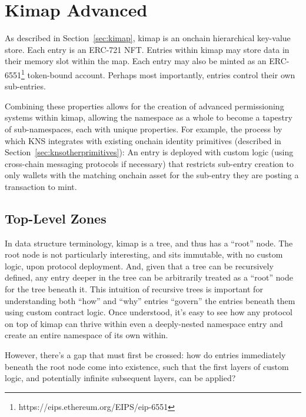 \documentclass[runningheads]{llncs}
\begin{document}
\section{Kimap Advanced}
\label{sec:kimapadvanced}

As described in Section~\ref{sec:kimap}, kimap is an onchain hierarchical key-value store.
Each entry is an ERC-721 NFT.
Entries within kimap may store data in their memory slot within the map.
Each entry may also be minted as an ERC-6551\footnote{https://eips.ethereum.org/EIPS/eip-6551} token-bound account.
Perhaps most importantly, entries control their own sub-entries.

Combining these properties allows for the creation of advanced permissioning systems within kimap, allowing the namespace as a whole to become a tapestry of sub-namespaces, each with unique properties.
For example, the process by which KNS integrates with existing onchain identity primitives (described in Section~\ref{sec:knsotherprimitives}):
An entry is deployed with custom logic (using cross-chain messaging protocols if necessary) that restricts sub-entry creation to only wallets with the matching onchain asset for the sub-entry they are posting a transaction to mint.

\subsection{Top-Level Zones}
\label{sec:tlz}

In data structure terminology, kimap is a tree, and thus has a ``root'' node.
The root node is not particularly interesting, and sits immutable, with no custom logic, upon protocol deployment.
And, given that a tree can be recursively defined, any entry deeper in the tree can be arbitrarily treated as a ``root'' node for the tree beneath it.
This intuition of recursive trees is important for understanding both ``how'' and ``why'' entries ``govern'' the entries beneath them using custom contract logic.
Once understood, it's easy to see how any protocol on top of kimap can thrive within even a deeply-nested namespace entry and create an entire namespace of its own within.

However, there's a gap that must first be crossed: how do entries immediately beneath the root node come into existence, such that the first layers of custom logic, and potentially infinite subsequent layers, can be applied?
\end{document}
